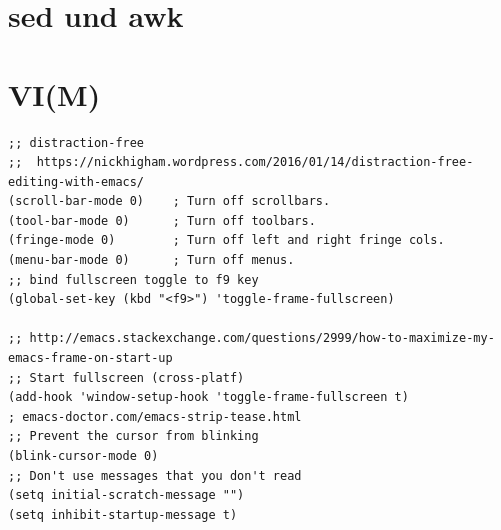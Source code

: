 \documentclass[12pt,ngerman]{scrbook}
\begin{document}
\section{sed und awk}

\section{VI(M)}



\backmatter

\blindtext

\begin{lstlisting}[basicstyle=\ttfamily] % <--- here
;; distraction-free
;;  https://nickhigham.wordpress.com/2016/01/14/distraction-free-editing-with-emacs/
(scroll-bar-mode 0)    ; Turn off scrollbars.
(tool-bar-mode 0)      ; Turn off toolbars.
(fringe-mode 0)        ; Turn off left and right fringe cols.
(menu-bar-mode 0)      ; Turn off menus.
;; bind fullscreen toggle to f9 key
(global-set-key (kbd "<f9>") 'toggle-frame-fullscreen)

;; http://emacs.stackexchange.com/questions/2999/how-to-maximize-my-emacs-frame-on-start-up
;; Start fullscreen (cross-platf)
(add-hook 'window-setup-hook 'toggle-frame-fullscreen t)
; emacs-doctor.com/emacs-strip-tease.html
;; Prevent the cursor from blinking
(blink-cursor-mode 0)
;; Don't use messages that you don't read
(setq initial-scratch-message "")
(setq inhibit-startup-message t)
\end{lstlisting}

\nocite{*}

\printbibliography 
\end{document}
